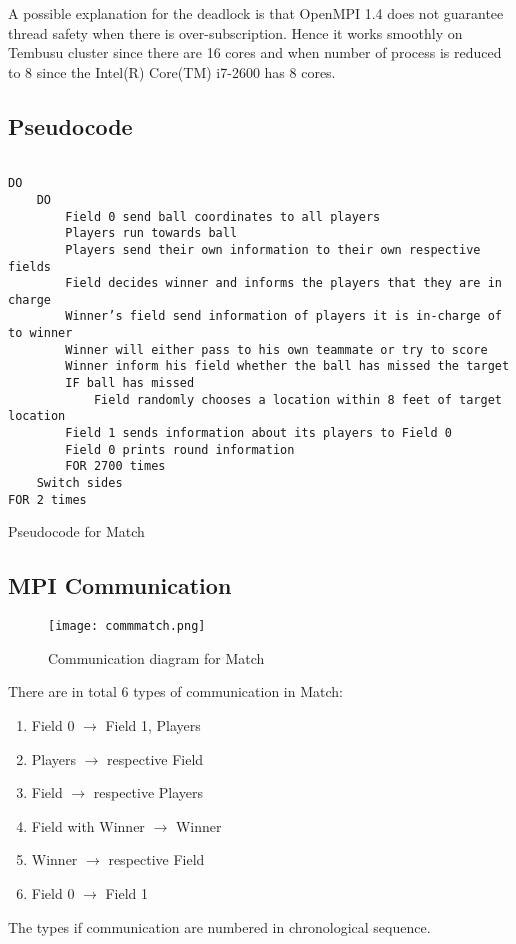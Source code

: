 \documentclass{article}
\begin{document}
A possible explanation for the deadlock is that OpenMPI 1.4 does not guarantee thread safety when there is over-subscription. Hence it works smoothly on Tembusu cluster since there are 16 cores and when number of process is reduced to 8 since the Intel(R) Core(TM) i7-2600 has 8 cores.

\subsection{Pseudocode}
\begin{program}[H]
\begin{verbatim}

DO
    DO
        Field 0 send ball coordinates to all players
        Players run towards ball
        Players send their own information to their own respective fields
        Field decides winner and informs the players that they are in charge
        Winner’s field send information of players it is in-charge of to winner
        Winner will either pass to his own teammate or try to score
        Winner inform his field whether the ball has missed the target
        IF ball has missed
            Field randomly chooses a location within 8 feet of target location
        Field 1 sends information about its players to Field 0
        Field 0 prints round information
        FOR 2700 times
    Switch sides
FOR 2 times
\end{verbatim}
  \caption{Pseudocode for Match}
\end{program}

\subsection{MPI Communication}

\begin{figure}[H]
\centering
\texttt{[image: commmatch.png]}
\caption{Communication diagram for Match}
\label{pic:commmatch}
\end{figure}

There are in total 6 types of communication in Match:
\begin{enumerate}
\item Field 0 $\rightarrow$ Field 1, Players
\item Players $\rightarrow$ respective Field
\item Field $\rightarrow$ respective Players
\item Field with Winner $\rightarrow$ Winner
\item Winner $\rightarrow$ respective Field
\item Field 0 $\rightarrow$ Field 1
\end{enumerate}
The types if communication are numbered in chronological sequence.
\end{document}
